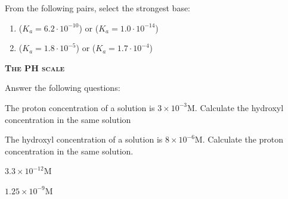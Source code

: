 \documentclass[main.tex]{subfiles}
\begin{document}
\begin{multicols*}{2}
\begin{question}[ID=\the\value{numA}]
From the following pairs, select the strongest base:
\begin{enumerate}[label=(\alph*)]
\item  {} ($K_a=6.2\cdot 10^{-10}$) or  ($K_a=1.0\cdot 10^{-14}$) %
\item  {} ($K_a=1.8\cdot 10^{-5}$) or  ($K_a=1.7\cdot 10^{-4}$) %
 \end{enumerate}
\end{question}
\begin{solution}
\begin{inparaenum}[(a)]
\item   {} 
\item  {}   
 \end{inparaenum}
\hspace{0.1cm}\end{solution}%
 







{\raggedright\textsc{\textbf{The PH scale}}\par}


\begin{question}[ID=\the\value{numA}]
Answer the following questions:
\begin{inparaenum}[(a)]
\item The proton concentration of a solution is $3\times 10^{-3}$M. Calculate the hydroxyl concentration in the same solution %
\item The hydroxyl concentration of a solution is $8\times 10^{-6}$M. Calculate the proton concentration in the same solution.%
 \end{inparaenum}
\end{question}
\begin{solution}
\begin{inparaenum}[(a)]
\item  $3.3\times 10^{-12}$M
\item  $1.25\times 10^{-9}$M
 \end{inparaenum}
\hspace{0.1cm}\end{solution}%



\end{multicols*}
\end{document}
